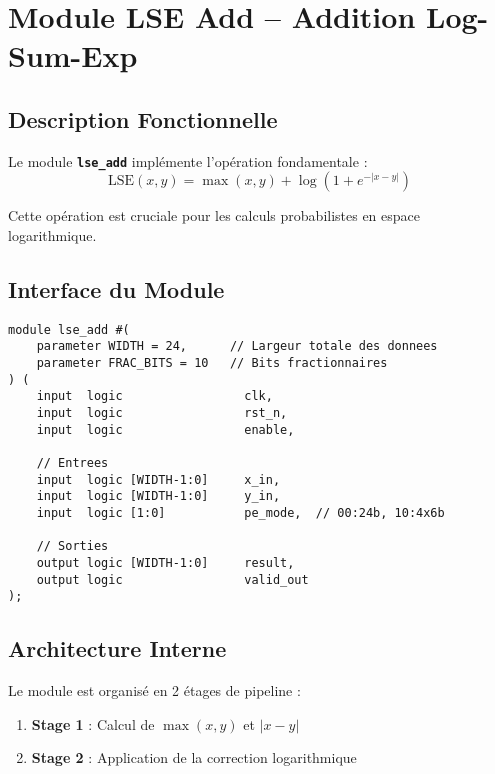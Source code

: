 \documentclass[12pt,a4paper]{article}
\newcommand{\module}[1]{\textbf{\texttt{#1}}}
\begin{document}
\section{Module LSE Add -- Addition Log-Sum-Exp}

\subsection{Description Fonctionnelle}

Le module \module{lse\_add} implémente l'opération fondamentale :
\begin{equation}
\text{LSE}(x, y) = \max(x, y) + \log(1 + e^{-|x-y|})
\end{equation}

Cette opération est cruciale pour les calculs probabilistes en espace logarithmique.

\subsection{Interface du Module}

\begin{lstlisting}[style=verilog, caption={Interface du module lse\_add.sv}]
module lse_add #(
    parameter WIDTH = 24,      // Largeur totale des donnees
    parameter FRAC_BITS = 10   // Bits fractionnaires
) (
    input  logic                 clk,
    input  logic                 rst_n,
    input  logic                 enable,
    
    // Entrees
    input  logic [WIDTH-1:0]     x_in,
    input  logic [WIDTH-1:0]     y_in,
    input  logic [1:0]           pe_mode,  // 00:24b, 10:4x6b
    
    // Sorties
    output logic [WIDTH-1:0]     result,
    output logic                 valid_out
);
\end{lstlisting}

\subsection{Architecture Interne}

Le module est organisé en 2 étages de pipeline :

\begin{enumerate}
    \item \textbf{Stage 1} : Calcul de $\max(x,y)$ et $|x-y|$
    \item \textbf{Stage 2} : Application de la correction logarithmique
\end{enumerate}
\end{document}
